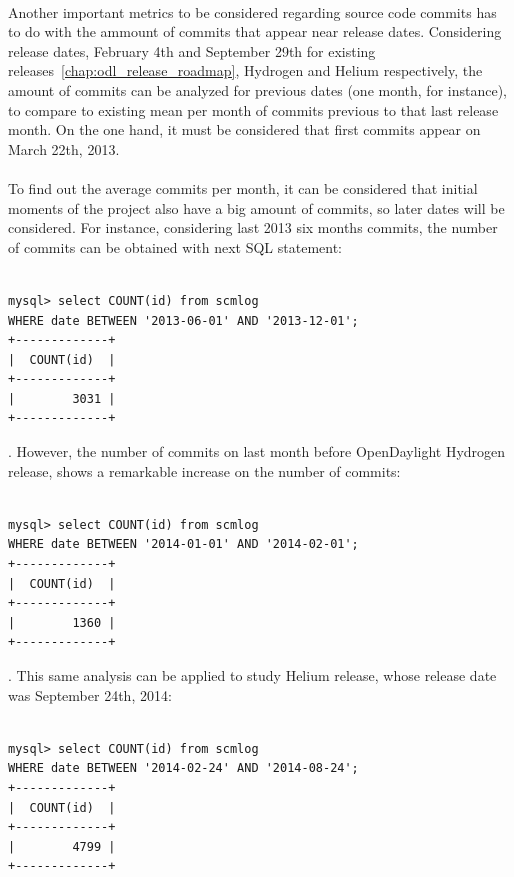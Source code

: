 \documentclass[a4paper, 12pt]{book}
\begin{document}
\\
Another important metrics to be considered regarding source code commits has to do with the ammount of commits that appear near release dates. Considering release dates, February 4th and September 29th for existing releases~\ref{chap:odl_release_roadmap}, Hydrogen and Helium respectively, the amount of commits can be analyzed for previous dates (one month, for instance), to compare to existing mean per month of commits previous to that last release month. On the one hand, it must be considered that first commits appear on March 22th, 2013.\\
\\
To find out the average commits per month, it can be considered that initial moments of the project also have a big amount of commits, so later dates will be considered. For instance, considering last 2013 six months commits, the number of commits can be obtained with next SQL statement:

\begin{verbatim}

mysql> select COUNT(id) from scmlog
WHERE date BETWEEN '2013-06-01' AND '2013-12-01';
+-------------+
|  COUNT(id)  |
+-------------+
|        3031 |
+-------------+

\end{verbatim}

. However, the number of commits on last month before OpenDaylight Hydrogen release, shows a remarkable increase on the number of commits:

\begin{verbatim}

mysql> select COUNT(id) from scmlog
WHERE date BETWEEN '2014-01-01' AND '2014-02-01';
+-------------+
|  COUNT(id)  |
+-------------+
|        1360 |
+-------------+

\end{verbatim}
. This same analysis can be applied to study Helium release, whose release date was September 24th, 2014:

\begin{verbatim}

mysql> select COUNT(id) from scmlog
WHERE date BETWEEN '2014-02-24' AND '2014-08-24';
+-------------+
|  COUNT(id)  |
+-------------+
|        4799 |
+-------------+

\end{verbatim}
\end{document}
